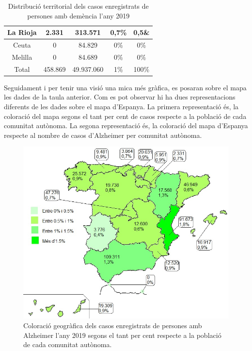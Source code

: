 \documentclass[a4paper,12pt]{article}
\begin{document}
\begin{table}[h]
\begin{tabular}{ |c | c | c | c | c| }
          \hline
         La Rioja & 2.331 & 313.571 & 0,7\% & 0,5\& \\ 
          \hline
         Ceuta & 0 & 84.829 & 0\%  & 0\% \\ 
          \hline
         Melilla & 0 & 84.689 & 0\%  & 0\% \\
          \hline
        Total & 458.869 & 49.937.060 & 1\% & 100\% \\
          \hline
    \end{tabular}
    \caption{Distribució territorial dels casos enregistrats de persones amb demència l'any 2019}
    \label{tab:taula1}
\end{table}

Seguidament i per tenir una visió una mica més gràfica, es posaran sobre el mapa les dades de la taula anterior. Com es pot observar hi ha dues representacions diferents de les dades sobre el mapa d'Espanya. La primera representació és, la coloració del mapa segons el tant per cent de casos respecte a la població de cada comunitat autònoma. La segona representació és, la coloració del mapa d'Espanya respecte al nombre de casos d'Alzheimer per comunitat autònoma.
\begin{figure}[H]
    \centering
    \includegraphics[scale = 0.6]{images/distribucio territorial en base a percentatge.jpg}
    \caption{Coloració geogràfica dels casos enregistrats de persones amb Alzheimer l'any 2019 segons el tant per cent respecte a la població de cada comunitat autònoma.}
    \label{fig:colorpercent}
\end{figure}
\end{document}
